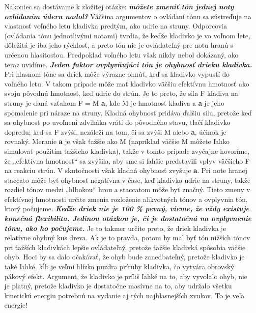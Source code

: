 \documentclass[11pt,a4paper%
]{book}
\begin{document}
Nakoniec sa dostávame k zložitej otázke: \emph{\textbf{môžete zmeniť tón jednej noty ovládaním úderu nadol?}} Väčšina argumentov o ovládaní tónu sa sústreďuje na vlastnosť voľného letu kladivka predtým, ako udrie na struny. Odporcovia (ovládania tónu jednotlivými notami) tvrdia, že keďže kladivko je vo voľnom lete, dôležitá je iba jeho rýchlosť, a preto tón nie je ovládateľný pre notu hranú s určenou hlasitosťou. Predpoklad voľného letu však nikdy nebol dokázaný, ako teraz uvidíme. \emph{\textbf{Jeden faktor ovplyvňujúci tón je ohybnosť drieku kladivka.}} Pri hlasnom tóne sa driek môže výrazne ohnúť, keď sa kladivko vypustí do voľného letu. V takom prípade môže mať kladivko väčšiu efektívnu hmotnosť ako svoju pôvodnú hmotnosť, keď udrie do strún. Je to preto, že sila F kladiva na struny je daná vzťahom F = M \textbf{a}, kde M je hmotnosť kladiva a \textbf{a} je jeho spomalenie pri náraze na struny. Kladná ohybnosť pridáva ďalšiu silu, pretože keď sa ohybnosť po uvoľnení zdviháka vráti do pôvodného stavu, tlačí kladivko dopredu; keď sa F zvýši, nezáleží na tom, či sa zvýši M alebo \textbf{a}, účinok je rovnaký. Meranie \textbf{a} je však ťažšie ako M (napríklad väčšie M môžete ľahko simulovať použitím ťažšieho kladivka), takže v tomto prípade zvyčajne hovoríme, že „efektívna hmotnosť`` sa zvýšila, aby sme si ľahšie predstavili vplyv väčšieho F na reakciu strún. V skutočnosti však kladná ohybnosť zvyšuje \textbf{a}. Pri note hranej staccato môže byť ohybnosť negatívna v čase, keď kladivko udrie na struny, takže rozdiel tónov medzi „hlbokou`` hrou a staccatom môže byť značný. Tieto zmeny v efektívnej hmotnosti určite zmenia rozloženie alikvotných tónov a ovplyvnia tón, ktorý počujeme. \emph{\textbf{Keďže driek nie je 100 \% pevný, vieme, že vždy existuje konečná flexibilita. Jedinou otázkou je, či je dostatočná na ovplyvnenie tónu, ako ho počujeme.}} Je to takmer určite preto, že driek kladivka je relatívne ohybný kus dreva. Ak je to pravda, potom by mal byť tón nižších tónov pri ťažších kladivkách lepšie ovládateľný, pretože ťažšie kladivká spôsobia väčšie ohyb. Hoci by sa dalo očakávať, že ohyb bude zanedbateľný, pretože kladivko je také ľahké, kĺb je veľmi blízko puzdra príruby kladivka, čo vytvára obrovský pákový efekt. Argument, že kladivko je príliš ľahké na to, aby vyvolalo ohyb, nie je platný, pretože kladivko je dostatočne masívne na to, aby udržalo všetku kinetickú energiu potrebnú na vydanie aj tých najhlasnejších zvukov. To je veľa energie!
\end{document}
